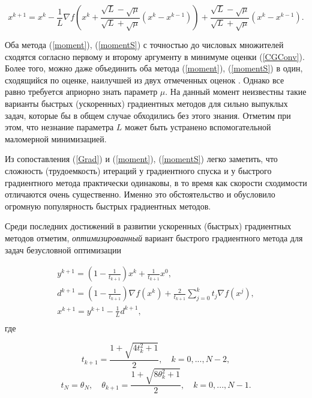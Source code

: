   \begin{equation}
  \label{momentS}
  x^{k+1}=x^k-\frac{1}{L}\nabla f\left( {x^k+\frac{\sqrt L -\sqrt \mu }{\sqrt 
  L +\sqrt \mu }\left( {x^k-x^{k-1}} \right)} \right)+\frac{\sqrt L -\sqrt \mu 
  }{\sqrt L +\sqrt \mu }\left( {x^k-x^{k-1}} \right).
  \end{equation}

  Оба метода (\ref{moment}), (\ref{momentS}) с точностью до числовых множителей сходятся согласно первому и второму аргументу в минимуме оценки (\ref{CGConv}). Более того, можно даже объединить оба метода (\ref{moment}), (\ref{momentS}) в один, сходящийся по оценке, наилучшей из двух отмеченных оценок \cite{nesterov2013introductory}. Однако все равно требуется априорно знать параметр $\mu$. На данный момент неизвестны такие варианты быстрых (ускоренных) градиентных методов для сильно выпуклых задач, которые бы в общем случае обходились без этого знания. Отметим при этом, что незнание параметра $L$ может быть устранено вспомогательной маломерной минимизацией.

  \iffalse
  Из сопоставления (\ref{Grad}) и (\ref{moment}), (\ref{momentS}) легко заметить, что сложность (трудоемкость) итераций у градиентного спуска и у быстрого градиентного метода практически одинаковы, в то время как скорости сходимости отличаются очень существенно. Именно это обстоятельство и обусловило огромную популярность быстрых градиентных методов. 

  Среди последних достижений в развитии ускоренных (быстрых) градиентных методов отметим, \textit{оптимизированный} вариант быстрого градиентного метода для задач безусловной оптимизации \cite{drori2018efficient}

  \begin{equation}
  \label{optim}
  \begin{array}{c}
   y^{k+1}=\left( {1-\frac{1}{t_{k+1} }} \right)x^k+\frac{1}{t_{k+1} }x^0, \\ 
   d^{k+1}=\left( {1-\frac{1}{t_{k+1} }} \right)\nabla f\left( {x^k} 
  \right)+\frac{2}{t_{k+1} }\sum_{j=0}^k {t_j \nabla f\left( {x^j} 
  \right)} , \\ 
   x^{k+1}=y^{k+1}-\frac{1}{L}d^{k+1}, \\ 
   \end{array}
  \end{equation}
  где

  \[
  t_{k+1} =\frac{1+\sqrt {4t_k^2 +1} }{2},
  \quad
  k=0,...,N-2,
  \]
  \[
  t_N =\theta _N ,
  \quad
  \theta _{k+1} =\frac{1+\sqrt {8\theta _k^2 +1} }{2},
  \quad
  k=0,...,N-1.
  \]

